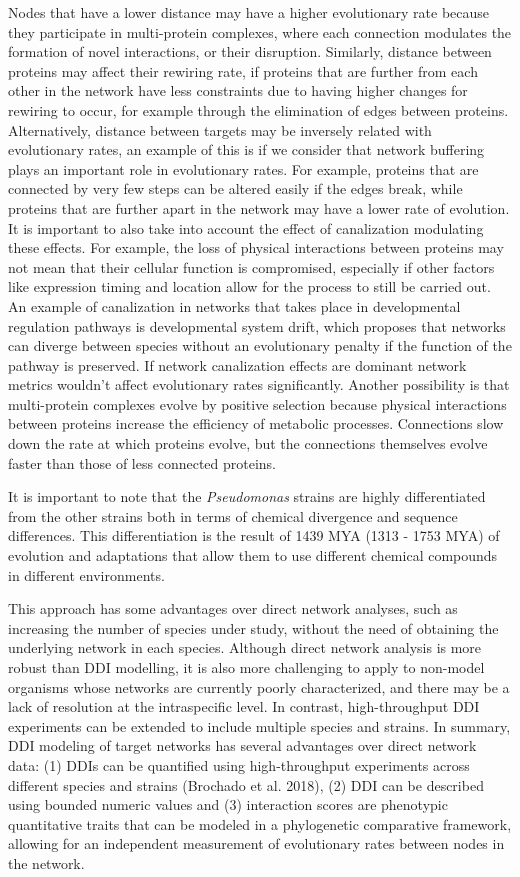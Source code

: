\documentclass[
]{article}
\begin{document}
Nodes that have a lower distance may have a higher evolutionary rate because they participate in multi-protein complexes, where each connection modulates the formation of novel interactions, or their disruption. Similarly, distance between proteins may affect their rewiring rate, if proteins that are further from each other in the network have less constraints due to having higher changes for rewiring to occur, for example through the elimination of edges between proteins. Alternatively, distance between targets may be inversely related with evolutionary rates, an example of this is if we consider that network buffering plays an important role in evolutionary rates. For example, proteins that are connected by very few steps can be altered easily if the edges break, while proteins that are further apart in the network may have a lower rate of evolution. It is important to also take into account the effect of canalization modulating these effects. For example, the loss of physical interactions between proteins may not mean that their cellular function is compromised, especially if other factors like expression timing and location allow for the process to still be carried out. An example of canalization in networks that takes place in developmental regulation pathways is developmental system drift, which proposes that networks can diverge between species without an evolutionary penalty if the function of the pathway is preserved. If network canalization effects are dominant network metrics wouldn't affect evolutionary rates significantly. Another possibility is that multi-protein complexes evolve by positive selection because physical interactions between proteins increase the efficiency of metabolic processes. Connections slow down the rate at which proteins evolve, but the connections themselves evolve faster than those of less connected proteins.

It is important to note that the \emph{Pseudomonas} strains are highly differentiated from the other strains both in terms of chemical divergence and sequence differences. This differentiation is the result of 1439 MYA (1313 - 1753 MYA) of evolution and adaptations that allow them to use different chemical compounds in different environments.

This approach has some advantages over direct network analyses, such as increasing the number of species under study, without the need of obtaining the underlying network in each species. Although direct network analysis is more robust than DDI modelling, it is also more challenging to apply to non-model organisms whose networks are currently poorly characterized, and there may be a lack of resolution at the intraspecific level. In contrast, high-throughput DDI experiments can be extended to include multiple species and strains. In summary, DDI modeling of target networks has several advantages over direct network data: (1) DDIs can be quantified using high-throughput experiments across different species and strains (Brochado et al. 2018), (2) DDI can be described using bounded numeric values and (3) interaction scores are phenotypic quantitative traits that can be modeled in a phylogenetic comparative framework, allowing for an independent measurement of evolutionary rates between nodes in the network.
\end{document}
